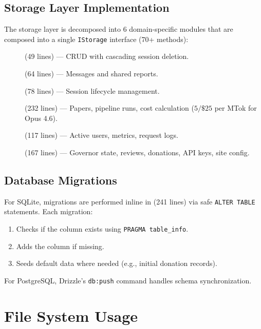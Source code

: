 \subsection{Storage Layer Implementation}

The storage layer is decomposed into 6 domain-specific modules that are composed into a single \texttt{IStorage} interface (70+ methods):

\begin{description}
  \item[] (49 lines) --- CRUD with cascading session deletion.
  \item[] (64 lines) --- Messages and shared reports.
  \item[] (78 lines) --- Session lifecycle management.
  \item[] (232 lines) --- Papers, pipeline runs, cost calculation ($5/\$25$ per MTok for Opus 4.6).
  \item[] (117 lines) --- Active users, metrics, request logs.
  \item[] (167 lines) --- Governor state, reviews, donations, API keys, site config.
\end{description}

\subsection{Database Migrations}

For SQLite, migrations are performed inline in  (241 lines) via safe \texttt{ALTER TABLE} statements.
Each migration:
\begin{enumerate}
  \item Checks if the column exists using \texttt{PRAGMA table\_info}.
  \item Adds the column if missing.
  \item Seeds default data where needed (e.g., initial donation records).
\end{enumerate}

For PostgreSQL, Drizzle's \texttt{db:push} command handles schema synchronization.

\section{File System Usage}
\label{sec:data:filesystem}

